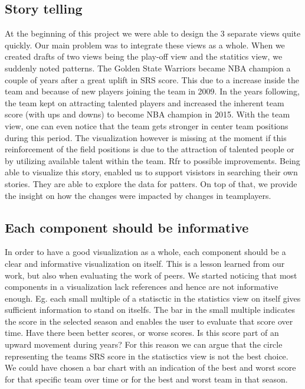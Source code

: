 \documentclass{sigchi}
\begin{document}
\subsection{Story telling}
At the beginning of this project we were able to design the 3 separate views 
quite quickly. Our main problem was to integrate these views as a whole. When we created drafts of two views being the play-off view and the statitics view, we suddenly noted patterns. The Golden State Warriors became NBA champion a couple of years after a great uplift in SRS score. This due to a increase inside the team and because of new players joining the team in 2009. In 
the years following, the team kept on attracting talented players and increased the inherent team score (with ups and downs) to become NBA champion in 2015. With the team view, one can even notice that the team gets stronger in center team positions during this period. The visualization however is missing at the moment if this reinforcement of the field positions
is due to the attraction of talented people or by utilizing available talent within the team. Rfr to possible improvements. Being able to visualize this story, enabled us to support visistors in searching their own stories. They are able to explore the data for patters. On top of that, we provide the insight on how the changes were impacted by changes in teamplayers.

\subsection{Each component should be informative}
In order to have a good visualization as a whole, each component should be a clear and 
informative visualization on itself. This is a lesson learned from our work, but also when
evaluating the work of peers. We started noticing that most components in a visualization 
lack references and hence are not informative enough. Eg. each small multiple of a statisctic
in the statistics view on itself gives sufficient information to stand on itselfs. The bar in
the small multiple indicates the score in the selected season and enables the user to evaluate
that score over time. Have there been better scores, or worse scores. Is this score part of 
an upward movement during years? 
For this reason we can argue that the circle representing the teams SRS score in the statisctics
view is not the best choice. We could have chosen a bar chart with an indication of the best and
worst score for that specific team over time or for the best and worst team in that season.
\end{document}
